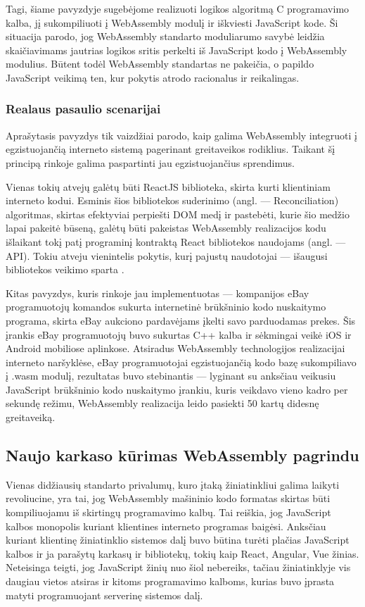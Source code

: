 \documentclass{VUMIFPSkursinis}
\begin{document}
Tagi, šiame pavyzdyje sugebėjome realizuoti logikos algoritmą C programavimo kalba, jį sukompiliuoti į WebAssembly modulį ir iškviesti JavaScript kode. Ši situacija parodo, jog WebAssembly standarto moduliarumo savybė leidžia skaičiavimams jautrias logikos sritis perkelti iš JavaScript kodo į WebAssembly modulius. Būtent todėl WebAssembly standartas ne pakeičia, o papildo JavaScript veikimą ten, kur pokytis atrodo racionalus ir reikalingas.

\subsubsection{Realaus pasaulio scenarijai}

Aprašytasis pavyzdys tik vaizdžiai parodo, kaip galima WebAssembly integruoti į egzistuojančią interneto sistemą pagerinant greitaveikos rodiklius. Taikant šį principą rinkoje galima paspartinti jau egzistuojančius sprendimus.

Vienas tokių atvejų galėtų būti ReactJS biblioteka, skirta kurti klientiniam interneto kodui. Esminis šios bibliotekos suderinimo (angl. — Reconciliation) algoritmas, skirtas efektyviai perpiešti DOM medį ir pastebėti, kurie šio medžio lapai pakeitė būseną, galėtų būti pakeistas WebAssembly realizacijos kodu išlaikant tokį patį programinį kontraktą React bibliotekos naudojams (angl. — API). Tokiu atveju vienintelis pokytis, kurį pajustų naudotojai — išaugusi bibliotekos veikimo sparta .

Kitas pavyzdys, kuris rinkoje jau implementuotas — kompanijos eBay programuotojų komandos sukurta internetinė brūkšninio kodo nuskaitymo programa, skirta eBay aukciono pardavėjams įkelti savo parduodamas prekes. Šis įrankis eBay programuotojų buvo sukurtas C++ kalba ir sėkmingai veikė iOS ir Android mobiliose aplinkose. Atsiradus WebAssembly technologijos realizacijai interneto naršyklėse, eBay programuotojai egzistuojančią kodo bazę sukompiliavo į .wasm modulį, rezultatas buvo stebinantis — lyginant su anksčiau veikusiu JavaScript brūkšninio kodo nuskaitymo įrankiu, kuris veikdavo vieno kadro per sekundę režimu, WebAssembly realizacija leido pasiekti 50 kartų didesnę greitaveiką.

\subsection{Naujo karkaso kūrimas WebAssembly pagrindu}
Vienas didžiausių standarto privalumų, kuro įtaką žiniatinkliui galima laikyti revoliucine, yra tai, jog WebAssembly mašininio kodo formatas skirtas būti kompiliuojamu iš skirtingų programavimo kalbų. Tai reiškia, jog JavaScript kalbos monopolis kuriant klientines interneto programas baigėsi. Anksčiau kuriant klientinę žiniatinklio sistemos dalį buvo būtina turėti plačias JavaScript kalbos ir ja parašytų karkasų ir bibliotekų, tokių kaip React, Angular, Vue žinias. Neteisinga teigti, jog JavaScript žinių nuo šiol nebereiks, tačiau žiniatinklyje vis daugiau vietos atsiras ir kitoms programavimo kalboms, kurias buvo įprasta matyti programuojant serverinę sistemos dalį.
\end{document}
